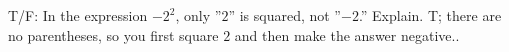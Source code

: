 {T/F: In the expression $-2^2$, only ''$2$'' is squared, not ''$-2$.'' Explain.}
{T; there are no parentheses, so you first square $2$ and then make the answer negative..}
